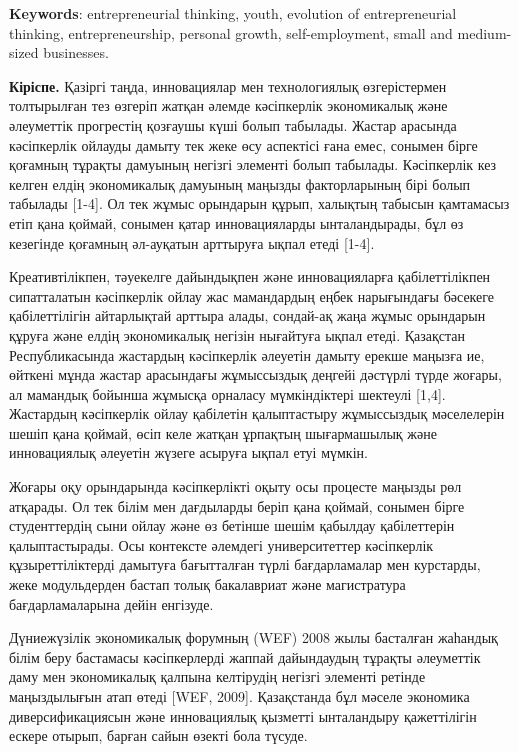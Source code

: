 {\bfseries Keywords}: entrepreneurial thinking, youth, evolution of
entrepreneurial thinking, entrepreneurship, personal growth,
self-employment, small and medium-sized businesses.
\begin{multicols}{2}

{\bfseries Кіріспе.} Қазіргі таңда, инновациялар мен технологиялық
өзгерістермен толтырылған тез өзгеріп жатқан әлемде кәсіпкерлік
экономикалық және әлеуметтік прогрестің қозғаушы күші болып табылады.
Жастар арасында кәсіпкерлік ойлауды дамыту тек жеке өсу аспектісі ғана
емес, сонымен бірге қоғамның тұрақты дамуының негізгі элементі болып
табылады. Кәсіпкерлік кез келген елдің экономикалық дамуының маңызды
факторларының бірі болып табылады {[}1-4{]}. Ол тек жұмыс орындарын
құрып, халықтың табысын қамтамасыз етіп қана қоймай, сонымен қатар
инновацияларды ынталандырады, бұл өз кезегінде қоғамның әл-ауқатын
арттыруға ықпал етеді {[}1-4{]}.

Креативтілікпен, тәуекелге дайындықпен және инновацияларға
қабілеттілікпен сипатталатын кәсіпкерлік ойлау жас мамандардың еңбек
нарығындағы бәсекеге қабілеттілігін айтарлықтай арттыра алады, сондай-ақ
жаңа жұмыс орындарын құруға және елдің экономикалық негізін нығайтуға
ықпал етеді. Қазақстан Республикасында жастардың кәсіпкерлік әлеуетін
дамыту ерекше маңызға ие, өйткені мұнда жастар арасындағы жұмыссыздық
деңгейі дәстүрлі түрде жоғары, ал мамандық бойынша жұмысқа орналасу
мүмкіндіктері шектеулі {[}1,4{]}. Жастардың кәсіпкерлік ойлау қабілетін
қалыптастыру жұмыссыздық мәселелерін шешіп қана қоймай, өсіп келе жатқан
ұрпақтың шығармашылық және инновациялық әлеуетін жүзеге асыруға ықпал
етуі мүмкін.

Жоғары оқу орындарында кәсіпкерлікті оқыту осы процесте маңызды рөл
атқарады. Ол тек білім мен дағдыларды беріп қана қоймай, сонымен бірге
студенттердің сыни ойлау және өз бетінше шешім қабылдау қабілеттерін
қалыптастырады. Осы контексте әлемдегі университеттер кәсіпкерлік
құзыреттіліктерді дамытуға бағытталған түрлі бағдарламалар мен
курстарды, жеке модульдерден бастап толық бакалавриат және магистратура
бағдарламаларына дейін енгізуде.

Дүниежүзілік экономикалық форумның (WEF) 2008 жылы басталған жаһандық
білім беру бастамасы кәсіпкерлерді жаппай дайындаудың тұрақты әлеуметтік
даму мен экономикалық қалпына келтірудің негізгі элементі ретінде
маңыздылығын атап өтеді {[}WEF, 2009{]}. Қазақстанда бұл мәселе
экономика диверсификациясын және инновациялық қызметті ынталандыру
қажеттілігін ескере отырып, барған сайын өзекті бола түсуде.


\end{multicols}
